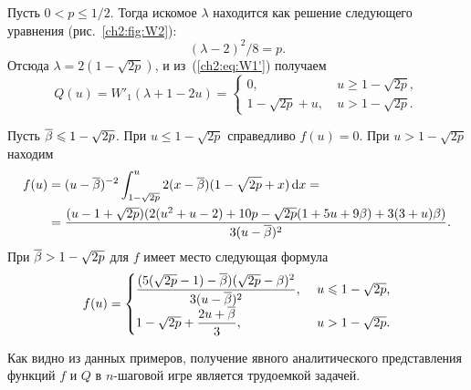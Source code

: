 {\begin{example}
  Пусть $0 < p \leq 1/2$.
  Тогда искомое $\lambda$ находится как решение следующего уравнения (\seename рис.~\ref{ch2:fig:W2}):
  \begin{equation*}
    (\lambda - 2)^2/8 = p.
  \end{equation*}
  Отсюда $\lambda = 2(1-\sqrt{2p})$, и из~(\ref{ch2:eq:W1'}) получаем
  \begin{equation*}
    Q(u) = W'_1(\lambda + 1 - 2u) = \begin{cases}
      0,\ & u \geq 1 - \sqrt{2p},\\
      1 - \sqrt{2p} + u,\ & u > 1 - \sqrt{2p}.
    \end{cases}
  \end{equation*}
  
  Пусть ${\overline{\beta}} \leqslant 1 - \sqrt{2p}$.
  При $u \leq 1 - \sqrt{2p}$ справедливо $f(u) = 0$.
  При $u > 1 - \sqrt{2p}$ находим
  \begin{align*}
    f(u) 
    &= (u-{\overline{\beta}})^{-2} \int_{1-\sqrt{2p}}^u 2 (x-{\overline{\beta}}) (1-\sqrt{2p}+x) \mathop{}\!\mathrm{d} x = \\
    &= \frac{(u - 1 + \sqrt{2p})(2(u^2 + u - 2) + 10p - \sqrt{2p}(1+5u+9\beta) + 3(3+u)\beta)}{3(u-{\overline{\beta}})^2}.
  \end{align*}
  При ${\overline{\beta}} > 1 - \sqrt{2p}$ для $f$ имеет место следующая формула
  \begin{equation*}
    f(u) =
    \begin{cases}
      {\displaystyle \frac{(5(\sqrt{2p}-1) - \ensuremath{{\overline{\beta}}})(\sqrt{2p} - \ensuremath{\beta})^2}{3(u - \ensuremath{{\overline{\beta}}})^2}},\ & u \leqslant 1 - \sqrt{2p}, \\
      1 - \sqrt{2p} + {\displaystyle \frac{2u + {\overline{\beta}}}{3}},\ & u > 1 - \sqrt{2p}.
    \end{cases}
  \end{equation*}
\end{example}

Как видно из данных примеров, получение явного аналитического представления функций $f$ и $Q$ в $n$-шаговой игре является трудоемкой задачей.
}

